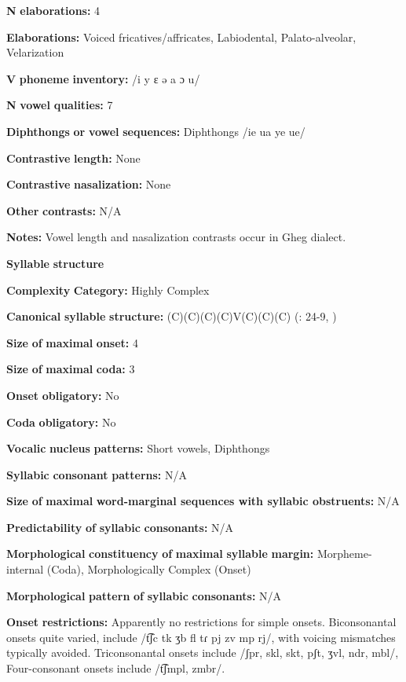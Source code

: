 \textbf{N} \textbf{elaborations:} 4

\textbf{Elaborations:} Voiced fricatives/affricates, Labiodental, Palato-alveolar, Velarization

\textbf{V} \textbf{phoneme} \textbf{inventory:} /i y ɛ ə a ɔ u/

\textbf{N} \textbf{vowel} \textbf{qualities:} 7

\textbf{Diphthongs} \textbf{or} \textbf{vowel} \textbf{sequences:} Diphthongs /ie ua ye ue/

\textbf{Contrastive} \textbf{length:} None

\textbf{Contrastive} \textbf{nasalization:} None

\textbf{Other} \textbf{contrasts:} N/A

\textbf{Notes:} Vowel length and nasalization contrasts occur in Gheg dialect.

\textbf{Syllable} \textbf{structure}

\textbf{Complexity} \textbf{Category:} Highly Complex

\textbf{Canonical} \textbf{syllable} \textbf{structure:} (C)(C)(C)(C)V(C)(C)(C) (\citealt{Newmark1957}: 24-9, \citealt{Klippenstein2010})

\textbf{Size} \textbf{of} \textbf{maximal} \textbf{onset:} 4

\textbf{Size} \textbf{of} \textbf{maximal} \textbf{coda:} 3

\textbf{Onset} \textbf{obligatory:} No

\textbf{Coda} \textbf{obligatory:} No

\textbf{Vocalic} \textbf{nucleus} \textbf{patterns:} Short vowels, Diphthongs

\textbf{Syllabic} \textbf{consonant} \textbf{patterns:} N/A

\textbf{Size} \textbf{of} \textbf{maximal} \textbf{word{}-marginal sequences with syllabic obstruents:} N/A

\textbf{Predictability} \textbf{of} \textbf{syllabic} \textbf{consonants:} N/A

\textbf{Morphological} \textbf{constituency} \textbf{of} \textbf{maximal} \textbf{syllable} \textbf{margin:} Morpheme-internal (Coda), Morphologically Complex (Onset)

\textbf{Morphological} \textbf{pattern} \textbf{of} \textbf{syllabic} \textbf{consonants:} N/A

\textbf{Onset} \textbf{restrictions:} Apparently no restrictions for simple onsets. Biconsonantal onsets quite varied, include /t͡ʃc tk ʒb fl tɾ pj zv mp rj/, with voicing mismatches typically avoided. Triconsonantal onsets include /ʃpr, skl, skt, pʃt, ʒvl, ndr, mbl/, Four-consonant onsets include /t͡ʃmpl, zmbr/.

